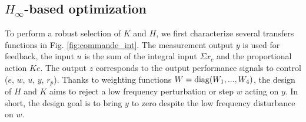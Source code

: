 \subsection{\texorpdfstring{$H_{\infty}$}{H {infty}}-based optimization} \label{sec:h_inf}

To perform a robust selection of $K$ and $H$, we first characterize several transfers functions in Fig. \ref{fig:commande_int}.
The measurement output $y$ is used for feedback, the input $u$ is the sum of the integral input $\Sigma x_{c}$ and the proportional action $K e$. The output $z$ corresponds to the output performance signals to control ($e$, $w$, $u$, $y$, $r_{p}$). Thanks to weighting functions $W=\operatorname{diag} (W_{1},..., W_{4})$, the design of $H$ and $K$ aims to reject a low frequency perturbation or step $w$ acting on $y$. In short, the design goal is to bring $y$ to zero despite the low frequency disturbance on $w$. 

